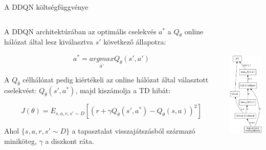 \documentclass[english, aspectratio=169]{beamer}
\begin{document}
\begin{frame}{A DDQN költségfüggvénye}
\begin{columns}
\begin{column}{.7\textwidth}
A DDQN architektúrában az optimális cselekvés $a^*$ a $Q_\theta$ online hálózat által lesz kiválasztva $s'$ következő állapotra:
\begin{block}{}
\[
a^*=\underset{a'}{argmax}Q_\theta(s',a')
\]
\end{block}
A $Q_{\bar{\theta}}$ célhálózat pedig kiértékeli az online hálózat által választott cselekvést: $Q_{\bar{\theta}}(s',a^*)$, majd kiszámolja a TD hibát: 
\begin{block}{}
\[
J(\theta) = E_{s,a,r,s' \sim D} \left[ \left( r + \gamma Q_{\bar{\theta}}(s',a^*) - Q_\theta(s,a) \right)^2 \right]
\]
\end{block}
Ahol $\{s,a,r,s' \sim D\}$ a tapasztalat visszajátszásból származó miniköteg, $\gamma$ a diszkont ráta. 
\end{column}
\begin{column}{.3\textwidth}
\begin{center}
\includegraphics[height=7cm, keepaspectratio]{graphs/dql_3.png}
\end{center}
\end{column}
\end{columns}
\end{frame}
\end{document}
